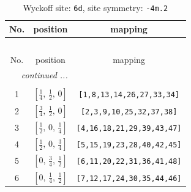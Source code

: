 \documentclass[fleqn,8pt]{jsarticle}
\begin{document}
\begin{longtable}{ccc}
\caption{Wyckoff site: {\tt 6d}, site symmetry: {\tt -4m.2}}
 \\
 \hline \hline
No. & position & mapping \\ \hline \endfirsthead

\multicolumn{2}{l}{\tablename\ \thetable{}} \\
 \hline \hline
No. & position & mapping \\ \hline \endhead

 \hline \hline
\multicolumn{2}{r}{\footnotesize\it continued ...} \\ \endfoot

 \hline \hline
\multicolumn{2}{r}{} \\ \endlastfoot

1 & $\left[ \frac{1}{4},\, \frac{1}{2},\, 0 \right]$ & {\tt [1,8,13,14,26,27,33,34]} \\ \hline
2 & $\left[ \frac{3}{4},\, \frac{1}{2},\, 0 \right]$ & {\tt [2,3,9,10,25,32,37,38]} \\ \hline
3 & $\left[ \frac{1}{2},\, 0,\, \frac{1}{4} \right]$ & {\tt [4,16,18,21,29,39,43,47]} \\ \hline
4 & $\left[ \frac{1}{2},\, 0,\, \frac{3}{4} \right]$ & {\tt [5,15,19,23,28,40,42,45]} \\ \hline
5 & $\left[ 0,\, \frac{3}{4},\, \frac{1}{2} \right]$ & {\tt [6,11,20,22,31,36,41,48]} \\ \hline
6 & $\left[ 0,\, \frac{1}{4},\, \frac{1}{2} \right]$ & {\tt [7,12,17,24,30,35,44,46]} \\
\end{longtable}
\renewcommand{\arraystretch}{1.2}
\end{document}
